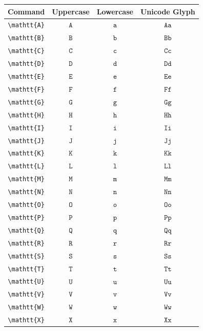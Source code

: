 \documentclass[12pt,a4paper]{article}
\begin{document}
\begin{longtable}{|c|c|c|c|}
\hline
\textbf{Command} & \textbf{Uppercase} & \textbf{Lowercase} & \textbf{Unicode Glyph} \\
\hline
\verb|\mathtt{A}| & $\mathtt{A}$ & $\mathtt{a}$ & $ 𝙰 𝚊 $ \\
\verb|\mathtt{B}| & $\mathtt{B}$ & $\mathtt{b}$ & $ 𝙱 𝚋 $ \\
\verb|\mathtt{C}| & $\mathtt{C}$ & $\mathtt{c}$ & $ 𝙲 𝚌 $ \\
\verb|\mathtt{D}| & $\mathtt{D}$ & $\mathtt{d}$ & $ 𝙳 𝚍 $ \\
\verb|\mathtt{E}| & $\mathtt{E}$ & $\mathtt{e}$ & $ 𝙴 𝚎 $ \\
\verb|\mathtt{F}| & $\mathtt{F}$ & $\mathtt{f}$ & $ 𝙵 𝚏 $ \\
\verb|\mathtt{G}| & $\mathtt{G}$ & $\mathtt{g}$ & $ 𝙶 𝚐 $ \\
\verb|\mathtt{H}| & $\mathtt{H}$ & $\mathtt{h}$ & $ 𝙷 𝚑 $ \\
\verb|\mathtt{I}| & $\mathtt{I}$ & $\mathtt{i}$ & $ 𝙸 𝚒 $ \\
\verb|\mathtt{J}| & $\mathtt{J}$ & $\mathtt{j}$ & $ 𝙹 𝚓 $ \\
\verb|\mathtt{K}| & $\mathtt{K}$ & $\mathtt{k}$ & $ 𝙺 𝚔 $ \\
\verb|\mathtt{L}| & $\mathtt{L}$ & $\mathtt{l}$ & $ 𝙻 𝚕 $ \\
\verb|\mathtt{M}| & $\mathtt{M}$ & $\mathtt{m}$ & $ 𝙼 𝚖 $ \\
\verb|\mathtt{N}| & $\mathtt{N}$ & $\mathtt{n}$ & $ 𝙽 𝚗 $ \\
\verb|\mathtt{O}| & $\mathtt{O}$ & $\mathtt{o}$ & $ 𝙾 𝚘 $ \\
\verb|\mathtt{P}| & $\mathtt{P}$ & $\mathtt{p}$ & $ 𝙿 𝚙 $ \\
\verb|\mathtt{Q}| & $\mathtt{Q}$ & $\mathtt{q}$ & $ 𝚀 𝚚 $ \\
\verb|\mathtt{R}| & $\mathtt{R}$ & $\mathtt{r}$ & $ 𝚁 𝚛 $ \\
\verb|\mathtt{S}| & $\mathtt{S}$ & $\mathtt{s}$ & $ 𝚂 𝚜 $ \\
\verb|\mathtt{T}| & $\mathtt{T}$ & $\mathtt{t}$ & $ 𝚃 𝚝 $ \\
\verb|\mathtt{U}| & $\mathtt{U}$ & $\mathtt{u}$ & $ 𝚄 𝚞 $ \\
\verb|\mathtt{V}| & $\mathtt{V}$ & $\mathtt{v}$ & $ 𝚅 𝚟 $ \\
\verb|\mathtt{W}| & $\mathtt{W}$ & $\mathtt{w}$ & $ 𝚆 𝚠 $ \\
\verb|\mathtt{X}| & $\mathtt{X}$ & $\mathtt{x}$ & $ 𝚇 𝚡 $ \\

\end{longtable}
\end{document}
